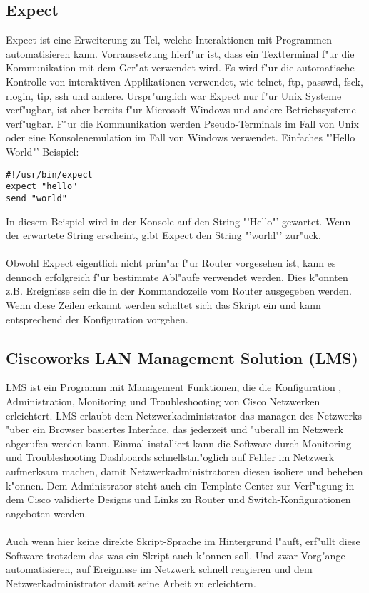 \documentclass[a4paper,12pt]{scrreprt}
\begin{document}
\subsection{Expect}
Expect ist eine Erweiterung zu Tcl, welche Interaktionen mit Programmen automatisieren kann. Vorraussetzung hierf"ur ist, dass ein Textterminal f"ur die Kommunikation mit dem Ger"at verwendet wird. Es wird f"ur die automatische Kontrolle von interaktiven Applikationen verwendet, wie telnet, ftp, passwd, fsck, rlogin, tip, ssh und andere. Urspr"unglich war Expect nur f"ur Unix Systeme verf"ugbar, ist aber bereits f"ur Microsoft Windows und andere Betriebssysteme verf"ugbar. F"ur die Kommunikation werden Pseudo-Terminals im Fall von Unix oder eine Konsolenemulation im Fall von Windows verwendet.\newpage
Einfaches "'Hello World"' Beispiel:
\begin{lstlisting}
#!/usr/bin/expect
expect "hello"
send "world"
\end{lstlisting}
In diesem Beispiel wird in der Konsole auf den String "'Hello"' gewartet. Wenn der erwartete String erscheint, gibt Expect den String "'world"' zur"uck. \\\\Obwohl Expect eigentlich nicht prim"ar f"ur Router vorgesehen ist, kann es dennoch erfolgreich f"ur bestimmte Abl"aufe verwendet werden. Dies k"onnten z.B. Ereignisse sein die in der Kommandozeile vom Router ausgegeben werden. Wenn diese Zeilen erkannt werden schaltet sich das Skript ein und kann entsprechend der Konfiguration vorgehen. \cite{exp1}
\subsection{Ciscoworks LAN Management Solution (LMS)}
LMS ist ein Programm mit Management Funktionen, die die Konfiguration , Administration, Monitoring und Troubleshooting von Cisco Netzwerken erleichtert. LMS erlaubt dem Netzwerkadministrator das managen des Netzwerks "uber ein Browser basiertes Interface, das jederzeit und "uberall im Netzwerk abgerufen werden kann. Einmal installiert kann die Software durch Monitoring und Troubleshooting Dashboards schnellstm"oglich auf Fehler im Netzwerk aufmerksam machen, damit Netzwerkadministratoren diesen isoliere und beheben k"onnen. Dem Administrator steht auch ein Template Center zur Verf"ugung in dem Cisco validierte Designs und Links zu Router und Switch-Konfigurationen angeboten werden. \cite{cisc1}\\\\
Auch wenn hier keine direkte Skript-Sprache im Hintergrund l"auft, erf"ullt diese Software trotzdem das was ein Skript auch k"onnen soll. Und zwar Vorg"ange automatisieren, auf Ereignisse im Netzwerk schnell reagieren und dem Netzwerkadministrator damit seine Arbeit zu erleichtern. 
\end{document}
